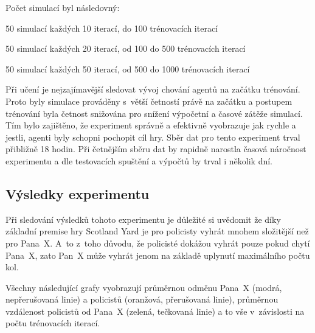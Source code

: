 Počet simulací byl následovný:
\begin{myitemize}
  \item 50 simulací každých 10 iterací, do 100 trénovacích iterací
  \item 50 simulací každých 20 iterací, od 100 do 500 trénovacích iterací
  \item 50 simulací každých 50 iterací, od 500 do 1000 trénovacích iterací
\end{myitemize}

Při učení je nejzajímavější sledovat vývoj chování agentů na začátku trénování.
Proto byly simulace prováděny s~větší četností právě na začátku a postupem trénování byla četnost snižována pro snížení výpočetní a časové zátěže simulací.
Tím bylo zajištěno, že experiment správně a efektivně vyobrazuje jak rychle a jestli, agenti byly schopni pochopit cíl hry.
Sběr dat pro tento experiment trval přibližně 18 hodin.
Při četnějším sběru dat by rapidně narostla časová náročnost experimentu a dle testovacích spuštění a výpočtů by trval i několik dní.

\subsection{Výsledky experimentu}
\label{subsec:vysledky-experimentu-1}

Při sledování výsledků tohoto experimentu je důležité si uvědomit že díky základní premise hry Scotland Yard je pro policisty vyhrát mnohem složitější než pro Pana~X\@.
A~to z~toho důvodu, že  policisté dokážou vyhrát pouze pokud chytí Pana~X, zato Pan~X může vyhrát jenom na základě uplynutí maximálního počtu kol.

Všechny následující grafy vyobrazují průměrnou odměnu Pana~X (modrá, nepřerušovaná linie) a policistů (oranžová, přerušovaná linie), průměrnou vzdálenost policistů od Pana~X (zelená, tečkovaná linie) a to vše v~závislosti na počtu trénovacích iterací.


